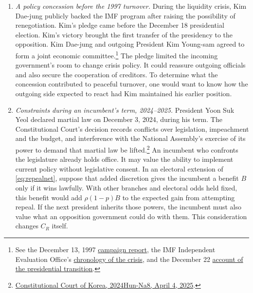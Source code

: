 \documentclass[11pt,letterpaper]{article}
\newcommand{\refsource}[2]{\href{#1}{#2}}
\begin{document}
\begin{enumerate}
\item \emph{A policy concession before the 1997 turnover.} During the liquidity crisis, Kim Dae-jung publicly backed the IMF program after raising the possibility of renegotiation. Kim's pledge came before the December 18 presidential election. Kim's victory brought the first transfer of the presidency to the opposition. Kim Dae-jung and outgoing President Kim Young-sam agreed to form a joint economic committee.\footnote{See the December 13, 1997 \refsource{https://www.latimes.com/archives/la-xpm-1997-dec-13-fi-63515-story.html}{campaign report}, the IMF Independent Evaluation Office's \refsource{https://ieo.imf.org/-/media/IEO/Files/evaluations/completed/07-28-2003-imf-and-recent-capital-account-crises-indonesia-korea-brazil/capital-account-crises-annex-2.ashx}{chronology of the crisis}, and the December 22 \refsource{https://nautilus.org/napsnet/napsnet-daily-report/napsnet-daily-report-22-december-1997/}{account of the presidential transition}.} The pledge limited the incoming government's room to change crisis policy. It could reassure outgoing officials and also secure the cooperation of creditors. To determine what the concession contributed to peaceful turnover, one would want to know how the outgoing side expected to react had Kim maintained his earlier position.
\item \emph{Constraints during an incumbent's term, 2024--2025.} President Yoon Suk Yeol declared martial law on December 3, 2024, during his term. The Constitutional Court's decision records conflicts over legislation, impeachment and the budget, and interference with the National Assembly's exercise of its power to demand that martial law be lifted.\footnote{\refsource{https://english.ccourt.go.kr/site/eng/ex/bbs/List.do?cbIdx=1143&searchBcIdx=4258448}{Constitutional Court of Korea, 2024Hun-Na8, April 4, 2025}.} An incumbent who confronts the legislature already holds office. It may value the ability to implement current policy without legislative consent. In an electoral extension of \eqref{eq:repealnet}, suppose that added discretion gives the incumbent a benefit $B$ only if it wins lawfully. With other branches and electoral odds held fixed, this benefit would add $\rho(1-p)B$ to the expected gain from attempting repeal. If the next president inherits those powers, the incumbent must also value what an opposition government could do with them. This consideration changes $C_R$ itself.


\end{enumerate}
\end{document}
